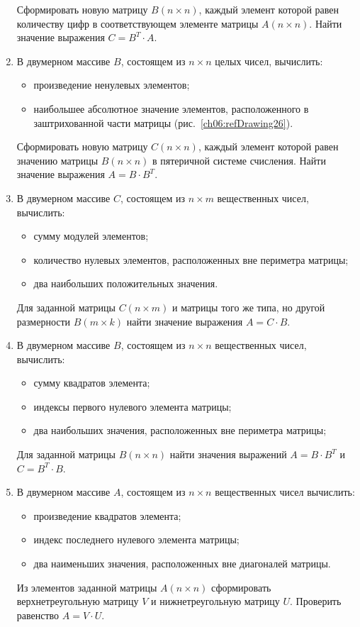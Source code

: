\begin{enumerate}
Сформировать новую матрицу $B(n\times n)$, каждый элемент которой равен количеству цифр
в соответствующем элементе матрицы $A(n\times n)$. Найти
значение выражения  $C=B^T\cdot A$.


\item В двумерном массиве $B$, состоящем из $n\times n$ целых чисел, вычислить:

\begin{itemize}
\item произведение ненулевых элементов;
\item наибольшее абсолютное значение элементов, расположенного в заштрихованной 
части матрицы (рис.~\ref{ch06:refDrawing26}).
\end{itemize}

Сформировать новую матрицу $C(n\times n)$, каждый элемент которой равен значению матрицы
$B(n\times n)$ в пятеричной системе счисления. Найти
значение выражения  $A=B\cdot B^T$.


\item В двумерном массиве $C$, состоящем из $n\times m$ вещественных чисел, вычислить:

\begin{itemize}
\item сумму модулей элементов;
\item количество нулевых элементов, расположенных вне периметра матрицы;
\item два наибольших положительных значения.
\end{itemize}

Для заданной матрицы $C(n\times m)$ и матрицы того же типа, но другой размерности
$B(m\times k)$ найти значение выражения  $A=C\cdot B$.

\item В двумерном массиве $B$, состоящем из $n\times n$ вещественных чисел, вычислить:

\begin{itemize}
\item сумму квадратов элемента;
\item индексы первого нулевого элемента матрицы;
\item два наибольших значения, расположенных вне периметра матрицы;
\end{itemize}

Для заданной матрицы $B(n\times n)$ найти значения выражений  $A=B\cdot B^T$ и 
$C=B^T\cdot B$.
\item В двумерном массиве $A$, состоящем из $n\times n$ вещественных чисел
вычислить:

\begin{itemize}
\item произведение квадратов элемента;
\item индекс последнего нулевого элемента матрицы;
\item два наименьших значения, расположенных вне диагоналей матрицы.
\end{itemize}

Из элементов заданной матрицы $A(n\times n)$ сформировать верхнетреугольную матрицу
$V$ и нижнетреугольную матрицу $U$. Проверить равенство  $A=V\cdot U$.
\end{enumerate}

